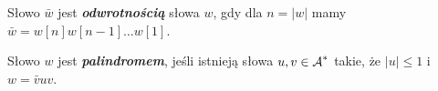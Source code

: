 \begin{definition}{}{}
  Słowo $\bar{w}$ jest \textbf{\textit{odwrotnością}} słowa $w$, gdy dla $n = |w|$ mamy $\bar{w} = w[n] w[n - 1] \ldots w[1]$.
\end{definition}

\begin{definition}{}{}
  Słowo $w$ jest \textbf{\textit{palindromem}}, jeśli istnieją słowa $u, v \in \operatorname{\mathcal{A}}^*$ takie, że $|u| \le 1$ i $w = \bar{v} u v$.
\end{definition}
